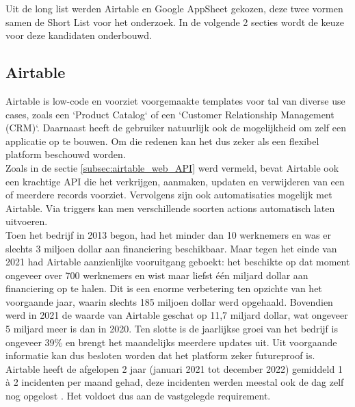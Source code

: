 Uit de long list werden Airtable en Google AppSheet gekozen, deze twee vormen samen de Short List voor het onderzoek. In de volgende 2 secties wordt de keuze voor deze kandidaten onderbouwd. 

\subsection{Airtable} 

Airtable is low-code en voorziet voorgemaakte templates voor tal van diverse use cases, zoals een `Product Catalog` of een `Customer Relationship Management (CRM)`. Daarnaast heeft de gebruiker natuurlijk ook de mogelijkheid om zelf een applicatie op te bouwen. Om die redenen kan het dus zeker als een flexibel platform beschouwd worden. \\

Zoals in de sectie \ref{subsec:airtable_web_API} werd vermeld, bevat Airtable ook een krachtige API die het verkrijgen, aanmaken, updaten en verwijderen van een of meerdere records voorziet. Vervolgens zijn ook automatisaties mogelijk met Airtable. Via triggers kan men verschillende soorten actions automatisch laten uitvoeren. \\

Toen het bedrijf in 2013 begon, had het minder dan 10 werknemers en was er slechts 3 miljoen dollar aan financiering beschikbaar. Maar tegen het einde van 2021 had Airtable aanzienlijke vooruitgang geboekt: het beschikte op dat moment ongeveer over 700 werknemers en wist maar liefst één miljard dollar aan financiering op te halen. Dit is een enorme verbetering ten opzichte van het voorgaande jaar, waarin slechts 185 miljoen dollar werd opgehaald. Bovendien werd in 2021 de waarde van Airtable geschat op 11,7 miljard dollar, wat ongeveer 5 miljard meer is dan in 2020. Ten slotte is de jaarlijkse groei van het bedrijf is ongeveer 39\% en brengt het maandelijks meerdere updates uit. Uit voorgaande informatie kan dus besloten worden dat het platform zeker futureproof is. \\

Airtable heeft de afgelopen 2 jaar (januari 2021 tot december 2022) gemiddeld 1 à 2 incidenten per maand gehad, deze incidenten werden meestal ook de dag zelf nog opgelost . Het voldoet dus aan de vastgelegde requirement. \\

